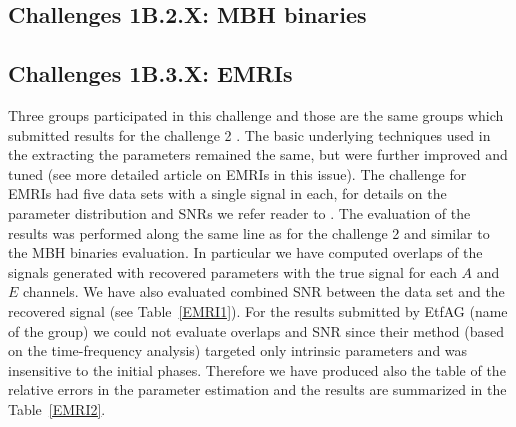 \documentclass{iopart}
\begin{document}
\subsection{Challenges 1B.2.X: MBH binaries}

\subsection{Challenges 1B.3.X: EMRIs}

Three groups participated in this challenge and those are the same groups which 
submitted results for the challenge 2 \cite{mldcgwdaw2}. The basic underlying techniques 
used in the extracting the parameters remained the same, but were further 
improved and tuned (see more detailed article on EMRIs in this issue).
The challenge for EMRIs had five data sets with a single signal in each, for details on the 
parameter distribution and SNRs we refer reader to \cite{mldcgwdaw2}. The evaluation of the 
results was performed along the same line as for the challenge 2 and similar to the MBH binaries 
evaluation. In particular we have computed overlaps of the signals generated with recovered 
parameters with the true signal for each $A$ and $E$ channels. We have also evaluated 
combined SNR between the data set and the recovered signal (see Table~\ref{EMRI1}).
 For the results submitted by EtfAG (name of the group) we could not evaluate overlaps and 
 SNR since their method (based on the time-frequency analysis) targeted only intrinsic parameters and was insensitive to the initial phases. Therefore we have produced also the table of the relative errors in the parameter estimation and the results are summarized in the 
 Table~\ref{EMRI2}.
 
\end{document}
